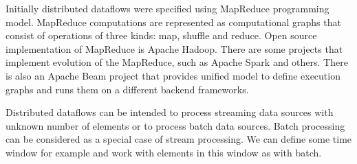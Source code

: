 
Initially distributed dataflows were specified using MapReduce programming model.
MapReduce computations are represented as computational graphs that consist of operations of three kinds: map, shuffle and reduce.
Open source implementation of MapReduce is Apache Hadoop.
There are some projects that implement evolution of the MapReduce, such as Apache Spark and others.
There is also an Apache Beam project that provides unified model to define execution graphs and runs them on a different backend frameworks.

Distributed dataflows can be intended to process streaming data sources with unknown number of elements or to process batch data sources.
Batch processing can be considered as a special case of stream processing.
We can define some time window for example and work with elements in this window as with batch.

